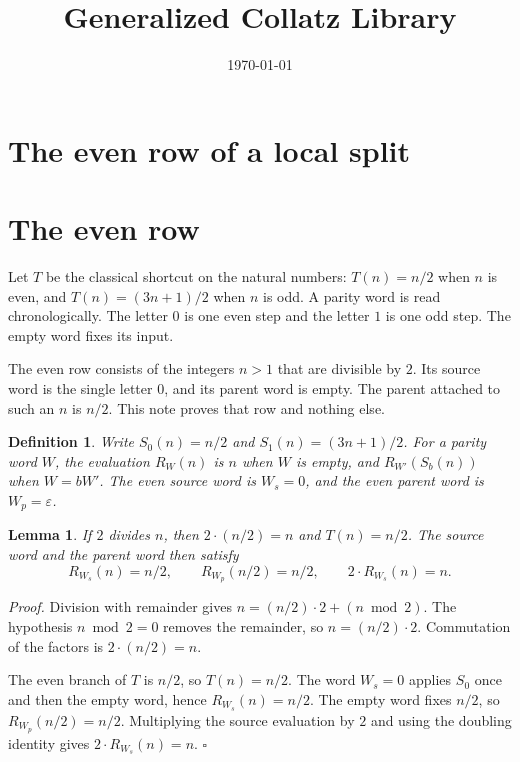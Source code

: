 \documentclass[11pt,letterpaper]{article}
\title{Generalized Collatz Library}
\author{}
\date{\today}
\newtheorem{lemma}[theorem]{Lemma}
\newtheorem{definition}[theorem]{Definition}
\newenvironment{proof}{\noindent\textit{Proof.}}{\hfill\(\square\)}
\begin{document}
\maketitle
\section*{The even row of a local split}

\section*{The even row}

Let \(T\) be the classical shortcut on the natural numbers: \(T(n)=n/2\) when \(n\) is even, and \(T(n)=(3n+1)/2\) when \(n\) is odd. A parity word is read chronologically. The letter \(0\) is one even step and the letter \(1\) is one odd step. The empty word fixes its input.

The even row consists of the integers \(n>1\) that are divisible by \(2\). Its source word is the single letter \(0\), and its parent word is empty. The parent attached to such an \(n\) is \(n/2\). This note proves that row and nothing else.

\begin{definition}
\label{def:words}
Write \(S_0(n)=n/2\) and \(S_1(n)=(3n+1)/2\). For a parity word \(W\), the evaluation \(R_W(n)\) is \(n\) when \(W\) is empty, and \(R_{W'}(S_b(n))\) when \(W=bW'\). The even source word is \(W_s=0\), and the even parent word is \(W_p=\varepsilon\).
\end{definition}

\begin{lemma}
\label{lem:identity}
If \(2\) divides \(n\), then \(2\cdot(n/2)=n\) and \(T(n)=n/2\). The source word and the parent word then satisfy
\[
R_{W_s}(n)=n/2, \qquad R_{W_p}(n/2)=n/2, \qquad 2\cdot R_{W_s}(n)=n.
\]
\end{lemma}

\begin{proof}
Division with remainder gives \(n=(n/2)\cdot 2+(n\bmod 2)\). The hypothesis \(n\bmod 2=0\) removes the remainder, so \(n=(n/2)\cdot 2\). Commutation of the factors is \(2\cdot(n/2)=n\).

The even branch of \(T\) is \(n/2\), so \(T(n)=n/2\). The word \(W_s=0\) applies \(S_0\) once and then the empty word, hence \(R_{W_s}(n)=n/2\). The empty word fixes \(n/2\), so \(R_{W_p}(n/2)=n/2\). Multiplying the source evaluation by \(2\) and using the doubling identity gives \(2\cdot R_{W_s}(n)=n\).
\end{proof}
\end{document}
